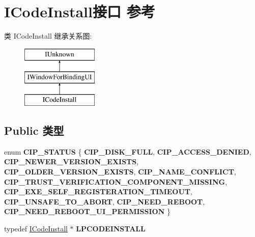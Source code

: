 \hypertarget{interface_i_code_install}{}\section{I\+Code\+Install接口 参考}
\label{interface_i_code_install}
类 I\+Code\+Install 继承关系图\+:\begin{figure}[H]
\begin{center}
\leavevmode
\includegraphics[height=3.000000cm]{interface_i_code_install}
\end{center}
\end{figure}
\subsection*{Public 类型}
\begin{DoxyCompactItemize}
\item 
\mbox{\label{interface_i_code_install_aca33d1e776928ac7d1195f270e4be74d}} 
enum {\bfseries C\+I\+P\+\_\+\+S\+T\+A\+T\+US} \{ \newline
{\bfseries C\+I\+P\+\_\+\+D\+I\+S\+K\+\_\+\+F\+U\+LL}, 
{\bfseries C\+I\+P\+\_\+\+A\+C\+C\+E\+S\+S\+\_\+\+D\+E\+N\+I\+ED}, 
{\bfseries C\+I\+P\+\_\+\+N\+E\+W\+E\+R\+\_\+\+V\+E\+R\+S\+I\+O\+N\+\_\+\+E\+X\+I\+S\+TS}, 
{\bfseries C\+I\+P\+\_\+\+O\+L\+D\+E\+R\+\_\+\+V\+E\+R\+S\+I\+O\+N\+\_\+\+E\+X\+I\+S\+TS}, 
\newline
{\bfseries C\+I\+P\+\_\+\+N\+A\+M\+E\+\_\+\+C\+O\+N\+F\+L\+I\+CT}, 
{\bfseries C\+I\+P\+\_\+\+T\+R\+U\+S\+T\+\_\+\+V\+E\+R\+I\+F\+I\+C\+A\+T\+I\+O\+N\+\_\+\+C\+O\+M\+P\+O\+N\+E\+N\+T\+\_\+\+M\+I\+S\+S\+I\+NG}, 
{\bfseries C\+I\+P\+\_\+\+E\+X\+E\+\_\+\+S\+E\+L\+F\+\_\+\+R\+E\+G\+I\+S\+T\+E\+R\+A\+T\+I\+O\+N\+\_\+\+T\+I\+M\+E\+O\+UT}, 
{\bfseries C\+I\+P\+\_\+\+U\+N\+S\+A\+F\+E\+\_\+\+T\+O\+\_\+\+A\+B\+O\+RT}, 
\newline
{\bfseries C\+I\+P\+\_\+\+N\+E\+E\+D\+\_\+\+R\+E\+B\+O\+OT}, 
{\bfseries C\+I\+P\+\_\+\+N\+E\+E\+D\+\_\+\+R\+E\+B\+O\+O\+T\+\_\+\+U\+I\+\_\+\+P\+E\+R\+M\+I\+S\+S\+I\+ON}
 \}
\item 
\mbox{\label{interface_i_code_install_aed4961702d5c3052e776232e1013d642}} 
typedef \hyperlink{interface_i_code_install}{I\+Code\+Install} $\ast$ {\bfseries L\+P\+C\+O\+D\+E\+I\+N\+S\+T\+A\+LL}
\end{DoxyCompactItemize}
